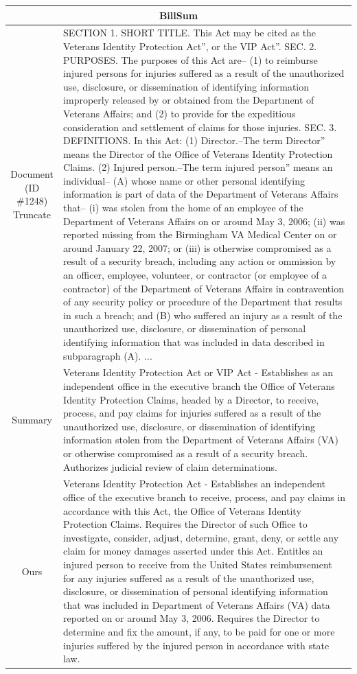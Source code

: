 \begin{table}[h!]
\begin{tabular}{c|p{}}
  \multicolumn{2}{c}{BillSum} \\ \hline
  \makecell{Document\\(ID \#1248)\\Truncate} & SECTION 1. SHORT TITLE. This Act may be cited as the   Veterans Identity Protection Act'', or the   VIP Act''. SEC. 2. PURPOSES. The purposes of this Act are-- (1) to reimburse injured persons for injuries suffered as a result of the unauthorized use, disclosure, or dissemination of identifying information improperly released by or obtained from the Department of Veterans Affairs; and (2) to provide for the expeditious consideration and settlement of claims for those injuries. SEC. 3. DEFINITIONS. In this Act: (1) Director.--The term   Director'' means the Director of the Office of Veterans Identity Protection Claims. (2) Injured person.--The term   injured person'' means an individual-- (A) whose name or other personal identifying information is part of data of the Department of Veterans Affairs that-- (i) was stolen from the home of an employee of the Department of Veterans Affairs on or around May 3, 2006; (ii) was reported missing from the Birmingham VA Medical Center on or around January 22, 2007; or (iii) is otherwise compromised as a result of a security breach, including any action or ommission by an officer, employee, volunteer, or contractor (or employee of a contractor) of the Department of Veterans Affairs in contravention of any security policy or procedure of the Department that results in such a breach; and (B) who suffered an injury as a result of the unauthorized use, disclosure, or dissemination of personal identifying information that was included in data described in subparagraph (A). ...\\\hline
  Summary & Veterans Identity Protection Act or VIP Act - Establishes as an independent office in the executive branch the Office of Veterans Identity Protection Claims, headed by a Director, to receive, process, and pay claims for injuries suffered as a result of the unauthorized use, disclosure, or dissemination of identifying information stolen from the Department of Veterans Affairs (VA) or otherwise compromised as a result of a security breach. Authorizes judicial review of claim determinations. \\\hline
  Ours & Veterans Identity Protection Act - Establishes an independent office of the executive branch to receive, process, and pay claims in accordance with this Act, the Office of Veterans Identity Protection Claims. Requires the Director of such Office to investigate, consider, adjust, determine, grant, deny, or settle any claim for money damages asserted under this Act. Entitles an injured person to receive from the United States reimbursement for any injuries suffered as a result of the unauthorized use, disclosure, or dissemination of personal identifying information that was included in Department of Veterans Affairs (VA) data reported on or around May 3, 2006. Requires the Director to determine and fix the amount, if any, to be paid for one or more injuries suffered by the injured person in accordance with state law. \\\hline
  

\end{tabular}
\end{table}
